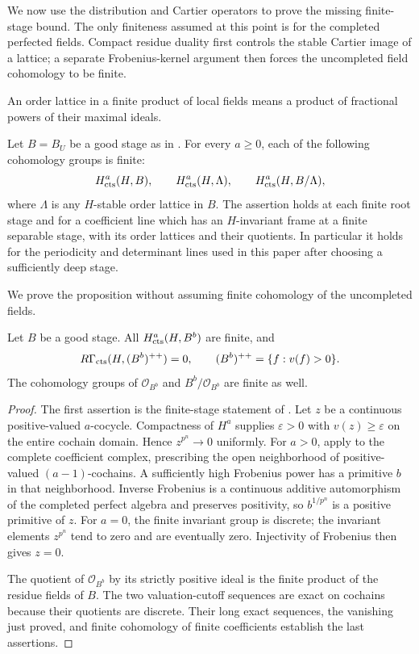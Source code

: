 We now use the distribution and Cartier operators to prove the missing
finite-stage bound.  The only finiteness assumed at this point is for
the completed perfected fields.  Compact residue duality first controls
the stable Cartier image of a lattice; a separate Frobenius-kernel
argument then forces the uncompleted field cohomology to be finite.

An order lattice in a finite product of local fields means a product of
fractional powers of their maximal ideals.

\begin{proposition}\label{h3:prop:finite-stage-finiteness}
Let $B=B_U$ be a good stage as in .
For every $a\geq0$, each of the following cohomology groups is finite:
\[
 H^a_{\mathrm{cts}}(H,B),\qquad
 H^a_{\mathrm{cts}}(H,\Lambda),\qquad
 H^a_{\mathrm{cts}}(H,B/\Lambda),
\]
where $\Lambda$ is any $H$-stable order lattice in $B$.
The assertion holds at each finite root stage and for a coefficient line
which has an $H$-invariant frame at a finite separable stage, with its
order lattices and their quotients.  In particular it holds for the
periodicity and determinant lines used in this paper after choosing a
sufficiently deep stage.
\end{proposition}

We prove the proposition without assuming finite cohomology of the
uncompleted fields.

\begin{lemma}\label{h3:co:completed-positive}
Let $B$ be a good stage.  All $H^a_{\mathrm{cts}}(H,B^b)$ are finite, and
\[
 R\Gamma_{\mathrm{cts}}(H,(B^b)^{++})=0,
 \qquad (B^b)^{++}=\{f:v(f)>0\}.
\]
The cohomology groups of $\mathcal O_{B^b}$ and
$B^b/\mathcal O_{B^b}$ are finite as well.
\end{lemma}

\begin{proof}
The first assertion is the finite-stage statement of
.  Let $z$ be a continuous positive-valued
$a$-cocycle.  Compactness of $H^a$ supplies $\varepsilon>0$ with
$v(z)\geq\varepsilon$ on the entire cochain domain.  Hence
$z^{p^n}\to0$ uniformly.  For $a>0$, apply  to the
complete coefficient complex, prescribing the open neighborhood of
positive-valued $(a-1)$-cochains.  A sufficiently high Frobenius power
has a primitive $b$ in that neighborhood.  Inverse Frobenius is a
continuous additive automorphism of the completed perfect algebra and
preserves positivity, so $b^{1/p^n}$ is a positive primitive of $z$.
For $a=0$, the finite invariant group is discrete; the invariant elements
$z^{p^n}$ tend to zero and are eventually zero.  Injectivity of Frobenius
then gives $z=0$.

The quotient of $\mathcal O_{B^b}$ by its strictly positive ideal is the
finite product of the residue fields of $B$.  The two valuation-cutoff
sequences are exact on cochains because their quotients are discrete.
Their long exact sequences, the vanishing just proved, and finite
cohomology of finite coefficients establish the last assertions.
\end{proof}

